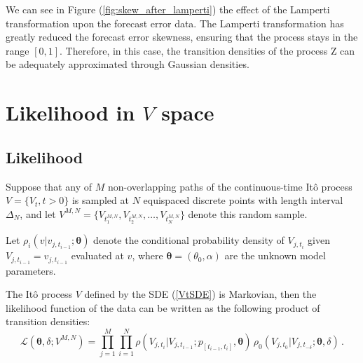 \documentclass[11pt]{article}
\theoremstyle{definition}
\begin{document}

We can see in Figure (\ref{fig:skew_after_lamperti}) the effect of the Lamperti transformation upon the forecast error data. 
The Lamperti transformation has greatly reduced the forecast error skewness, ensuring that the process stays in the range $[0,1]$. Therefore, in this case, the transition densities of the process Z can be adequately approximated through Gaussian densities.

\section{Likelihood in $V$ space} \label{Section_4}

\subsection{Likelihood}

Suppose that any of $M$ non-overlapping paths of the continuous-time It\^{o} process $V = \{ V_t, t >0 \}$ is sampled at $N$ equispaced discrete points with length interval $\Delta_N$, and let $ V^{M,N}=\{ V_{t_1^{M,N}} , V_{t_2^{M,N}} ,\ldots , V_{t_N^{M,N}} \}$ denote this random sample. 

Let $\rho_i(v \vert v_{j, t_{i-1}} ; \bm{\theta})$ denote the conditional probability density of $V_{j, t_i}$ given $V_{j, t_{i-1}} = v_{j, t_{i-1}}$ evaluated at $v$, where $\bm{\theta} = (\theta_0, \alpha)$ are the unknown model parameters.

The It\^{o} process $V$ defined by the SDE (\ref{VtSDE}) is Markovian, then the likelihood function of the data can be written as the following product of transition densities:  
\begin{equation}
\mathcal{L}(\bm{\theta},\delta; V^{M,N}) = \prod\limits_{j=1}^M \prod\limits_{i=1}^N \rho ( {V_{j, t_i}| V_{j, t_{i-1}}} ; p_{[t_{i-1}, t_{i}]},  \bm{\theta} )  \, \rho_0 (V_{j, t_0}|V_{j, t_{-\delta}};\bm{\theta},\delta) \,.
\label{likelihood}
\end{equation}
\end{document}
